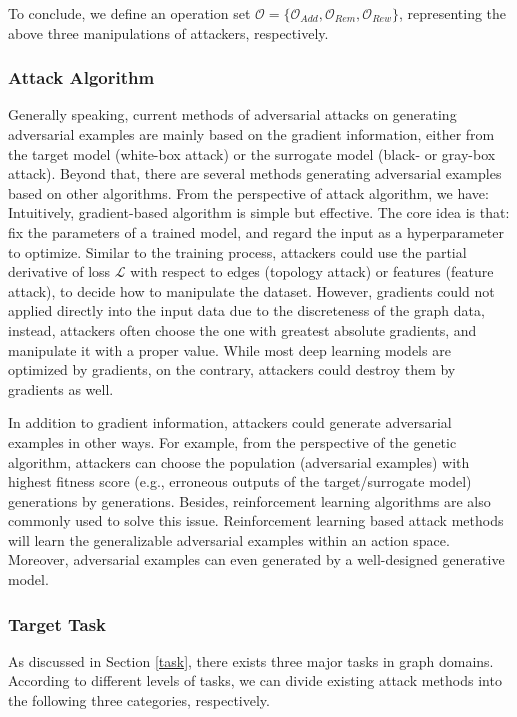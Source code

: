 To conclude, we define an operation set $\mathcal{O}=\{\mathcal{O}_{Add},\mathcal{O}_{Rem},\mathcal{O}_{Rew}\}$, representing the above three manipulations of attackers, respectively.

\subsubsection{Attack Algorithm}
Generally speaking, current methods of adversarial attacks on generating adversarial examples are mainly based on the gradient information, either from the target model (white-box attack) or the surrogate model (black- or gray-box attack). Beyond that, there are several methods generating adversarial examples based on other algorithms. From the perspective of attack algorithm, we have:
Intuitively, gradient-based algorithm is simple but effective. The core idea is that: fix the parameters of a trained model, and regard the input as a hyperparameter to optimize. Similar to the training process, attackers could use the partial derivative of loss $\mathcal{L}$ with respect to edges (topology attack) or features (feature attack), to decide how to manipulate the dataset. However, gradients could not applied directly into the input data due to the discreteness of the graph data, instead, attackers often choose the one with greatest absolute gradients, and manipulate it with a proper value. While most deep learning models are optimized by gradients, on the contrary, attackers could destroy them by gradients as well.

In addition to gradient information, attackers could generate adversarial examples in other ways. For example, from the perspective of the genetic algorithm, attackers can choose the population (adversarial examples) with highest fitness score (e.g., erroneous outputs of the target/surrogate model) generations by generations. Besides, reinforcement learning algorithms are also commonly used to solve this issue. Reinforcement learning based attack methods \cite{dai2018adversarial,ma2019attacking} will learn the generalizable adversarial examples within an action space. Moreover, adversarial examples can even generated by a well-designed generative model.

\subsubsection{Target Task}
As discussed in Section \ref{task}, there exists three major tasks in graph domains. According to different levels of tasks, we can divide existing attack methods into the following three categories, respectively.

